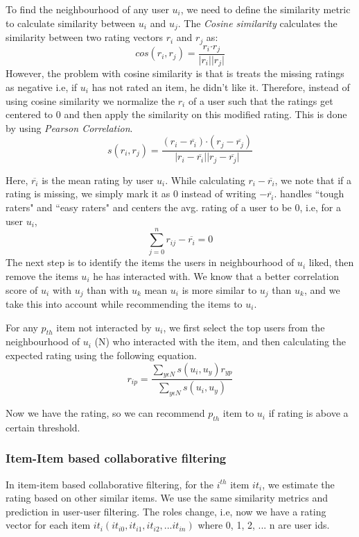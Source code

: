\documentclass[conference]{IEEEtran}
\begin{document}
To find the neighbourhood of any user \(u_{i}\), we need to define the similarity metric to calculate similarity between \(u_{i}\) and \(u_{j}\). The \textit{Cosine similarity} calculates the similarity between two rating vectors \(r_i\) and \(r_j\) as:
\begin{equation}
    cos(r_i, r_j) = \frac{r_i\boldsymbol{\cdot}r_j}{\lvert r_i \rvert \lvert r_j \rvert }
\end{equation}
However, the problem with cosine similarity is that is treats the missing ratings as negative i.e, if $u_i$ has not rated an item, he didn't like it. Therefore, instead of using cosine similarity we normalize the $r_i$ of a user such that the ratings get centered to 0 and then apply the similarity on this modified rating. This is done by using \textit{Pearson Correlation}.
\begin{equation}
    s(r_i, r_j) = \frac{(r_i - \overline{r_i})\boldsymbol{\cdot}(r_j - \overline{r_j})}{\lvert r_i - \overline{r_i} \rvert \lvert r_j - \overline{r_j} \rvert}
\end{equation}

Here, $\overline{r_i}$ is the mean rating by user $u_i$. While calculating $r_i - \overline{r_i}$, we note that if a rating is missing, we simply mark it as 0 instead of writing $-\overline{r_i}$.  handles ``tough raters" and ``easy raters" and centers the avg. rating of a user to be 0, i.e, for a user $u_i$, 
\begin{equation}
\sum_{j=0}^n r_{ij} -  \overline{r_{i}} = 0
\end{equation}
The next step is to identify the items the users in neighbourhood of $u_i$ liked, then remove the items $u_i$ he has interacted with. We know that a better correlation score of $u_i$ with $u_j$ than with $u_k$ mean $u_i$ is more similar to $u_j$ than $u_k$, and we take this into account while recommending the items to $u_i$. 

For any $p_{th}$ item not interacted by $u_i$, we first select the top users from the neighbourhood of $u_i$ (N) who interacted with the item, and then calculating the expected rating using the following equation.
\begin{equation}
    r_{ip} = \frac{\sum_{y \epsilon N} s(u_i, u_y)r_{yp}}{\sum_{y \epsilon N} s(u_i, u_y)}
\end{equation}

Now we have the rating, so we can recommend $p_{th}$ item to $u_i$ if rating is above a certain threshold.
\subsubsection{Item-Item based collaborative filtering}
In item-item based collaborative filtering, for the $i^{th}$ item $it_{i}$, we estimate the rating based on other similar items. We use the same similarity metrics and prediction in user-user filtering. The roles change, i.e, now we have a rating vector for each item $it_i(it_{i0}, it_{i1}, it_{i2}, ... it_{in})$ where 0, 1, 2, ... n are user ids.
\end{document}

